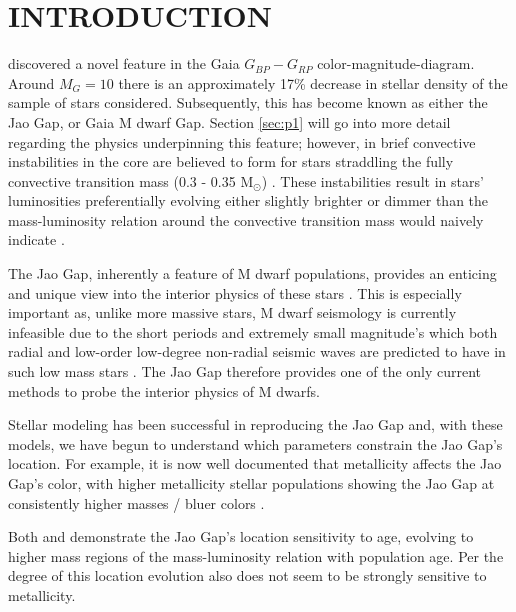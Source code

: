 \section{INTRODUCTION}\label{sec:intro}
\citet{Jao2018} discovered a novel feature in the Gaia $G_{BP}-G_{RP}$
color-magnitude-diagram. Around $M_{G}=10$ there is an approximately 17\%
decrease in stellar density of the sample of stars \citeauthor{Jao2018}
considered. Subsequently, this has become known as either the Jao Gap, or Gaia
M dwarf Gap. Section \ref{sec:p1} will go into more detail regarding the
physics underpinning this feature; however, in brief convective instabilities
in the core are believed to form for stars straddling the fully convective
transition mass (0.3 - 0.35 M$_{\odot}$) \citep{Baraffe2018}. These
instabilities result in stars' luminosities preferentially evolving either
slightly brighter or dimmer than the mass-luminosity relation around the
convective transition mass would naively indicate \citep{Jao2020}.

The Jao Gap, inherently a feature of M dwarf populations, provides an enticing
and unique view into the interior physics of these stars \citep{Feiden2021}.
This is especially important as, unlike more massive stars, M dwarf seismology
is currently infeasible due to the short periods and extremely small
magnitude's which both radial and low-order low-degree non-radial seismic waves
are predicted to have in such low mass stars \citep{Rodriguez-Lopez2019}. The
Jao Gap therefore provides one of the only current methods to probe the
interior physics of M dwarfs.

Stellar modeling has been successful in reproducing the Jao Gap
\citep[e.g.][]{Feiden2021,Mansfield2021} and, with these models, we have begun
to understand which parameters constrain the Jao Gap's location. For example,
it is now well documented that metallicity affects the Jao Gap's color, with
higher metallicity stellar populations showing the Jao Gap at consistently
higher masses / bluer colors \citep{Mansfield2021}.

Both \citeauthor{Feiden2021} and \citeauthor{Mansfield2021} demonstrate the Jao
Gap's location sensitivity to age, evolving to higher mass regions of the
mass-luminosity relation with population age. Per \citet{Mansfield2021} the
degree of this location evolution also does not seem to be strongly sensitive
to metallicity. 
